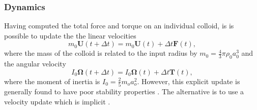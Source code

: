 \subsubsection{Dynamics}
Having computed the total force and torque on an individual colloid,
is is possible to update the the linear velocities
\begin{equation}
m_0 \mathbf{U}(t + \Delta t) = m_0 \mathbf{U}(t) + \Delta t \mathbf{F} (t),
\end{equation}
where the mass of the colloid is related to the input radius by
$m_0 = {\scriptstyle\frac{4}{3}}\pi\rho_0 a_0^3$ and the angular
velocity
\begin{equation}
I_0 \mathbf{\Omega} (t + \Delta t) = I_0 \mathbf{\Omega}(t) + \Delta t
\mathbf{T}(t),
\end{equation}
where the moment of inertia is $I_0 = {\scriptstyle\frac{2}{5}}m_o a_o^2$.
However, this explicit update is generally found to have poor stability
properties \cite{l94b, nl02}. The alternative is to use a velocity update
which is implicit \cite{heemels,nl02}.



